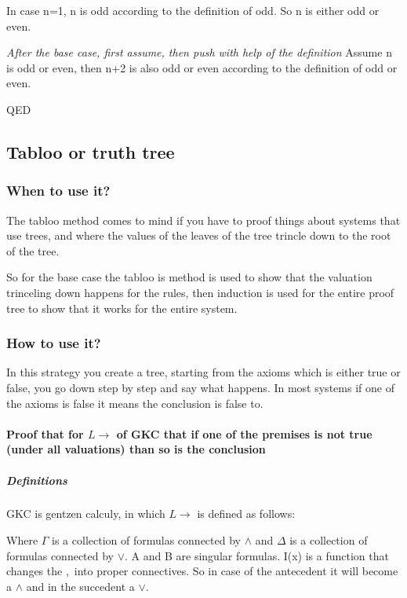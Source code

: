 \documentclass{article}
\begin{document}
In case n=1, n is odd according to the definition of odd. So n is either
odd or even.

\emph{After the base case, first assume, then push with help of the definition}
Assume n is odd or even, then n+2 is also odd or even according to the
definition of odd or even.

QED

\subsection{Tabloo or truth tree}
\subsubsection{When to use it?}
The tabloo method comes to mind if you have to proof things about systems
that use trees, and where the values of the leaves of the tree trincle down
to the root of the tree.

So for the base case the tabloo is method is used to show that the valuation
trinceling down happens for the rules, then induction is used for the entire
proof tree to show that it works for the entire system.

\subsubsection{How to use it?}
In this strategy you create a tree, starting from the axioms which is either
true or false, you go down step by step and say what happens. In most systems
if one of the axioms is false it means the conclusion is false to.


\paragraph{Proof that for $L\to$ of GKC that if one of the premises is not
true (under all valuations) than so is the conclusion}


\subparagraph{Definitions} GKC is gentzen calculy, in which $L\to$ is defined
as follows:

\begin{prooftree}
\end{prooftree}

Where $\Gamma$ is a collection of formulas connected by $\wedge$ and $\Delta$
is a collection of formulas connected by $\vee$.
A and B are singular formulas.
I(x) is a function that changes the $,$ into proper connectives. So in case
of the antecedent it will become a $\wedge$ and in the succedent a $\vee$.
\end{document}
